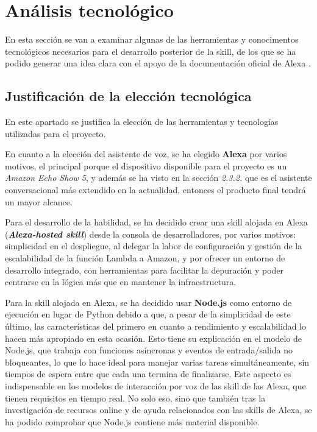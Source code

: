 \section{Análisis tecnológico}

En esta sección se van a examinar algunas de las herramientas y conocimentos tecnológicos necesarios para el desarrollo posterior de la skill, de los que se ha podido generar una idea clara con el apoyo de la documentación oficial de Alexa \parencite{alexaDocs}.

\subsection{Justificación de la elección tecnológica}

En este apartado se justifica la elección de las herramientas y tecnologías utilizadas para el proyecto.

En cuanto a la elección del asistente de voz, se ha elegido \textbf{Alexa} por varios motivos, el principal porque el dispositivo disponible para el proyecto es un \textit{Amazon Echo Show 5}, y además se ha visto en la sección \textit{2.3.2.} que es el asistente conversacional más extendido en la actualidad, entonces el producto final tendrá un mayor alcance.

Para el desarrollo de la habilidad, se ha decidido crear una skill alojada en Alexa (\textit{\textbf{Alexa-hosted skill}}) desde la consola de desarrolladores, por varios motivos: simplicidad en el despliegue, al delegar la labor de configuración y gestión de la escalabilidad de la función Lambda a Amazon, y por ofrecer un entorno de desarrollo integrado, con herramientas para facilitar la depuración y poder centrarse en la lógica más que en mantener la infraestructura. 

Para la skill alojada en Alexa, se ha decidido usar \textbf{Node.js} como entorno de ejecución en lugar de Python debido a que, a pesar de la simplicidad de este último, las características del primero en cuanto a rendimiento y escalabilidad lo hacen más apropiado en esta ocasión. Esto tiene su explicación en el modelo de Node.js, que trabaja con funciones asíncronas y eventos de entrada/salida no bloqueantes, lo que lo hace ideal para manejar varias tareas simultáneamente, sin tiempos de espera entre que cada una termina de finalizarse. Este aspecto es indispensable en los modelos de interacción por voz de las skill de las Alexa, que tienen requisitos en tiempo real. No solo eso, sino que también tras la investigación de recursos online y de ayuda relacionados con las skills de Alexa, se ha podido comprobar que Node.js contiene más material disponible.

